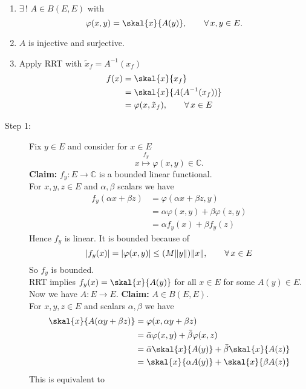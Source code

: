 \begin{beweis}
	\begin{enumerate}[Step 1:]
		\item $\exists\,!$ $A \in B(E,E)$ with
		\[
			\varphi(x,y)= \skal{x}{A(y)}, \qquad \forall\, x,y \in E.
		\]
		\item $A$ is injective and surjective.
		\item Apply RRT with $ \tilde x_f = A^{-1}(x_f)$
		\begin{align*}
			f(x) &= \skal{x}{x_f} \\ &= \skal{x}{A(A^{-1}(x_f))} \\ &= \varphi(x, \tilde x_f), \qquad \forall\, x \in E
		\end{align*}
	\end{enumerate}
	\begin{description}
		\item[Step 1:] Fix $y \in E$ and consider for $x \in E$
		\[
			x \stackrel{f_y}{\mapsto } \varphi(x,y) \in \mathbb{C}.
		\] 
		\textbf{Claim:} \text{    }$f_y: E \to \mathbb{C}$ is a bounded linear functional. \\
		For $x,y,z \in E$ and $\alpha,\beta$ scalars we have
		\begin{align*}
			f_y(\alpha x+ \beta z) &= \varphi(\alpha x + \beta z,y) \\
			&= \alpha \varphi(x,y) + \beta \varphi(z,y) \\
			&= \alpha f_y(x) + \beta f_y(z)  
		\end{align*}
		Hence $f_y$ is linear. It is bounded because of
		\[
			\abs{f_y(x)} = \abs{\varphi(x,y)} \leq (M \norm{y})\norm{x}, \qquad \forall\, x \in E
		\]
		So $f_y$ is bounded. \\
		RRT implies $f_y(x) = \skal{x}{A(y)}$ for all $x \in E$ for some $A(y) \in E$. \\ Now we have $A : E \to E$.
		\textbf{Claim:} \text{    }$A \in B(E,E)$. \\
		For $x,y,z \in E$ and scalars $\alpha, \beta$ we have
		\begin{align*}
			\skal{x}{A( \alpha y + \beta z)} &= \varphi(x, \alpha y + \beta z) \\
			&= \bar{\alpha} \varphi(x,y)+ \bar{\beta} \varphi(x,z) \\
			&= \bar{\alpha} \skal{x}{A(y)} + \bar{\beta} \skal{x}{A(z)} \\
			&= \skal{x}{\alpha A(y)}+ \skal{x}{\beta A(z)} \\
		\end{align*}
		This is equivalent to

\end{description}
\end{beweis}
